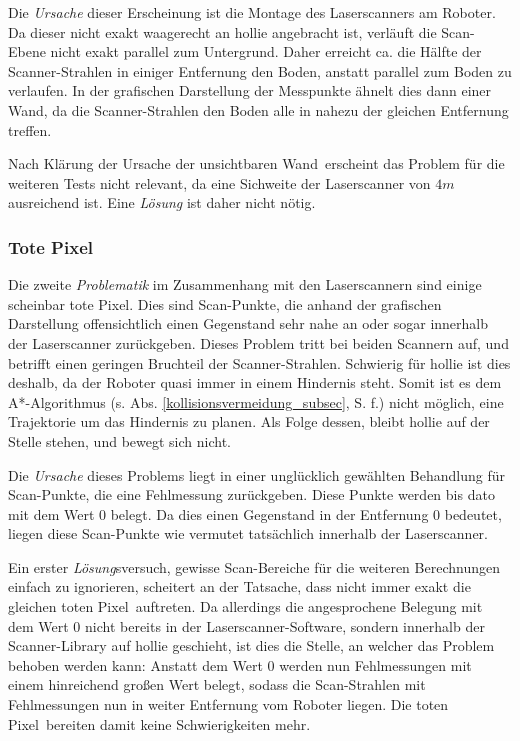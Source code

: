 Die \emph{Ursache} dieser Erscheinung ist die Montage des Laserscanners am Roboter.
Da dieser nicht exakt waagerecht an \gls{hollie} angebracht ist, verläuft die Scan-Ebene nicht exakt parallel zum Untergrund.
Daher erreicht ca. die Hälfte der Scanner-Strahlen in einiger Entfernung den Boden, anstatt parallel zum Boden zu verlaufen.
In der grafischen Darstellung der Messpunkte ähnelt dies dann einer Wand, da die Scanner-Strahlen den Boden alle in nahezu der gleichen Entfernung treffen.

Nach Klärung der Ursache der \glqq unsichtbaren Wand\grqq\ erscheint das Problem für die weiteren Tests nicht relevant, da eine Sichweite der Laserscanner von $4m$ ausreichend ist.
Eine \emph{Lösung} ist daher nicht nötig.


\subsubsection{\glqq Tote Pixel\grqq}

Die zweite \emph{Problematik} im Zusammenhang mit den Laserscannern sind einige scheinbar \glqq tote Pixel\grqq.
Dies sind Scan-Punkte, die anhand der grafischen Darstellung offensichtlich einen Gegenstand sehr nahe an oder sogar innerhalb der Laserscanner zurückgeben.
Dieses Problem tritt bei beiden Scannern auf, und betrifft einen geringen Bruchteil der Scanner-Strahlen.
Schwierig für \gls{hollie} ist dies deshalb, da der Roboter quasi immer in einem Hindernis steht.
Somit ist es dem A*-Algorithmus (s. Abs. \ref{kollisionsvermeidung_subsec}, S. \pageref{kollisionsvermeidung_subsec} f.) nicht möglich, eine Trajektorie um das Hindernis zu planen.
Als Folge dessen, bleibt \gls{hollie} auf der Stelle stehen, und bewegt sich nicht.

Die \emph{Ursache} dieses Problems liegt in einer unglücklich gewählten Behandlung für Scan-Punkte, die eine Fehlmessung zurückgeben.
Diese Punkte werden bis dato mit dem Wert 0 belegt.
Da dies einen Gegenstand in der Entfernung 0 bedeutet, liegen diese Scan-Punkte wie vermutet tatsächlich innerhalb der Laserscanner.

Ein erster \emph{Lösung}sversuch, gewisse Scan-Bereiche für die weiteren Berechnungen einfach zu ignorieren, scheitert an der Tatsache, dass nicht immer exakt die gleichen \glqq toten Pixel\grqq\ auftreten.
Da allerdings die angesprochene Belegung mit dem Wert 0 nicht bereits in der Laserscanner-Software, sondern innerhalb der Scanner-Library auf \gls{hollie} geschieht, ist dies die Stelle, an welcher das Problem behoben werden kann:
Anstatt dem Wert 0 werden nun Fehlmessungen mit einem hinreichend großen Wert belegt, sodass die Scan-Strahlen mit Fehlmessungen nun in weiter Entfernung vom Roboter liegen.
Die \glqq toten Pixel\grqq\ bereiten damit keine Schwierigkeiten mehr.


